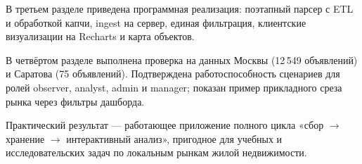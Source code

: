 \documentclass[coursework]{SCWorks}
\begin{document}
В третьем разделе приведена программная реализация: поэтапный парсер с ETL и обработкой капчи, ingest на сервер, единая фильтрация, клиентские визуализации на Recharts и карта объектов.

В четвёртом разделе выполнена проверка на данных Москвы (12\,549 объявлений) и Саратова (75 объявлений). Подтверждена работоспособность сценариев для ролей observer, analyst, admin и manager; показан пример прикладного среза рынка через фильтры дашборда.

Практический результат --- работающее приложение полного цикла «сбор $\rightarrow$ хранение $\rightarrow$ интерактивный анализ», пригодное для учебных и исследовательских задач по локальным рынкам жилой недвижимости.




\appendix

%
\end{document}

